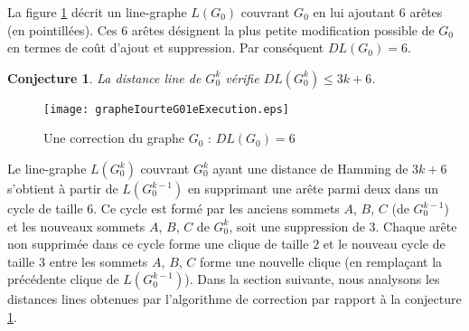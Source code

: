 \documentclass[onecolumn, 12pt]{book}
\newtheorem{conjecture}[theorem]{Conjecture}
\begin{document}
La figure \ref{grapheIourteG01eExecution} d\'ecrit un line-graphe $L(G_0)$ couvrant $G_0$ en lui ajoutant $6$ ar\^etes (en pointill\'ees).
Ces $6$ ar\^etes d\'esignent la plus petite modification possible de $G_0$ en termes de co\^ut d'ajout et suppression.
Par cons\'equent $DL(G_0) = 6$. 
\begin{conjecture}
\label{conjectureDLIourte}
La distance line de $G_0^k$ v\'erifie $DL(G_0^k) \le 3k+6$.
\end{conjecture}
\begin{figure}[htb!] 
\centering
\texttt{[image: grapheIourteG01eExecution.eps]}
\caption{Une correction du graphe $G_0$ : $DL(G_0) = 6$ }
\label{grapheIourteG01eExecution} 
\end{figure}
Le line-graphe  $L(G_0^k)$ couvrant $G_0^k$ ayant une distance de Hamming de $3k+6$ s'obtient \`a partir de  $L(G_0^{k-1})$ en supprimant une ar\^ete parmi deux dans un cycle de taille $6$. Ce cycle est form\'e par les anciens sommets $A$, $B$, $C$ (de $G_0^{k-1}$) et les nouveaux sommets $A$, $B$, $C$ de $G_0^k$, soit une suppression de $3$.
Chaque ar\^ete non supprim\'ee dans ce cycle forme une clique de taille $2$ et  le nouveau cycle de taille $3$ entre les sommets $A$, $B$, $C$ forme une nouvelle clique (en rempla\c cant la pr\'ec\'edente clique de $L(G_0^{k-1})$).
\newline
Dans la section suivante, nous analysons les distances lines obtenues par l'algorithme de correction par rapport \`a la conjecture \ref{conjectureDLIourte}.
\end{document}
